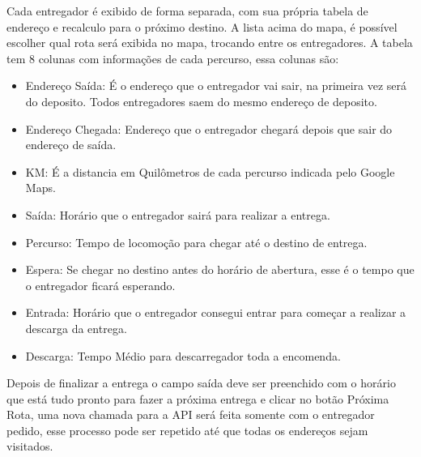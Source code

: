 \begin{center}
	\label{fig:InterfaceResultado}
\end{center}

Cada entregador é exibido de forma separada, com sua própria tabela de endereço e recalculo para o próximo destino. A lista acima do mapa, é possível escolher qual rota será exibida no mapa, trocando entre os entregadores.
A tabela tem 8 colunas com informações de cada percurso, essa colunas são:
\begin{itemize}
	\item Endereço Saída: É o endereço que o entregador vai sair, na primeira vez será do deposito. Todos entregadores saem do mesmo endereço de deposito.
	\item Endereço Chegada: Endereço que o entregador chegará depois que sair do endereço de saída.
	\item KM: É a distancia em Quilômetros de cada percurso indicada pelo Google Maps.
	\item Saída: Horário que o entregador sairá para realizar a entrega.
	\item Percurso: Tempo de locomoção para chegar até o destino de entrega.
	\item Espera: Se chegar no destino antes do horário de abertura, esse é o tempo que o entregador ficará esperando.
	\item Entrada: Horário que o entregador consegui entrar para começar a realizar a descarga da entrega.
	\item Descarga: Tempo Médio para descarregador toda a encomenda.
\end{itemize}
Depois de finalizar a entrega o campo saída deve ser preenchido com o horário que está tudo pronto para fazer a próxima entrega e clicar no botão Próxima Rota, uma nova chamada para a API será feita somente com o entregador pedido, esse processo pode ser repetido até que todas os endereços sejam visitados.
